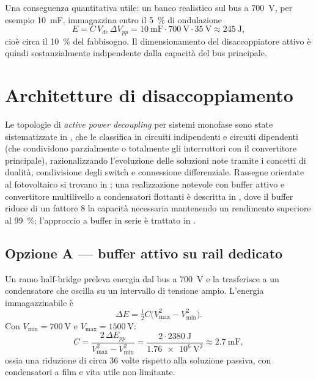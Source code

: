 \documentclass[11pt,a4paper]{article}
\begin{document}
Una conseguenza quantitativa utile: un banco realistico sul bus a \SI{700}{\volt}, per
esempio \SI{10}{\milli\farad}, immagazzina entro il \SI{5}{\percent} di ondulazione
\begin{equation}
E = C\,V_{dc}\,\Delta V_{pp} = \SI{10}{\milli\farad}\cdot\SI{700}{\volt}\cdot\SI{35}{\volt}
\approx \SI{245}{\joule},
\end{equation}
cioè circa il \SI{10}{\percent} del fabbisogno. Il dimensionamento del disaccoppiatore
attivo è quindi sostanzialmente indipendente dalla capacità del bus principale.

\section{Architetture di disaccoppiamento}

Le topologie di \emph{active power decoupling} per sistemi monofase sono state
sistematizzate in \cite{sun2016review}, che le classifica in circuiti indipendenti e
circuiti dipendenti (che condividono parzialmente o totalmente gli interruttori con il
convertitore principale), razionalizzando l'evoluzione delle soluzioni note tramite i
concetti di dualità, condivisione degli switch e connessione differenziale. Rassegne
orientate al fotovoltaico si trovano in \cite{hu2013review}; una realizzazione notevole
con buffer attivo e convertitore multilivello a condensatori flottanti è descritta in
\cite{lei2017fcml}, dove il buffer riduce di un fattore \num{8} la capacità necessaria
mantenendo un rendimento superiore al \SI{99}{\percent}; l'approccio a buffer in serie è
trattato in \cite{pierquet2013}.

\subsection{Opzione A --- buffer attivo su rail dedicato}

Un ramo half-bridge preleva energia dal bus a \SI{700}{\volt} e la trasferisce a un
condensatore che oscilla su un intervallo di tensione ampio. L'energia immagazzinabile è
\begin{equation}
\Delta E = \tfrac{1}{2}C\bigl(V_{\max}^2 - V_{\min}^2\bigr).
\end{equation}
Con $V_{\min}=\SI{700}{\volt}$ e $V_{\max}=\SI{1500}{\volt}$:
\begin{equation}
C = \frac{2\,\Delta E_{pp}}{V_{\max}^2-V_{\min}^2}
= \frac{2\cdot\SI{2380}{\joule}}{\SI{1.76e6}{\volt\squared}}
\approx \SI{2.7}{\milli\farad},
\end{equation}
ossia una riduzione di circa \num{36} volte rispetto alla soluzione passiva, con
condensatori a film e vita utile non limitante.
\end{document}
